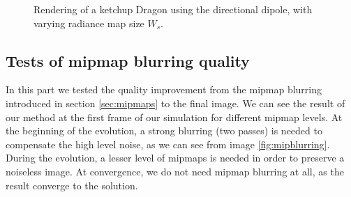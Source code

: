 \begin{figure}
{	\label{fig:pathDragonsize1024}
}
\label{fig:pathDragonsize}
\caption{Rendering of a ketchup Dragon using the directional dipole, with varying radiance map size $W_s$.}
\end{figure}

\FloatBarrier
\subsection{Tests of mipmap blurring quality}

In this part we tested the quality improvement from the mipmap blurring introduced in section \ref{sec:mipmaps} to the final image. We can see the result of our method at the first frame of our simulation for different mipmap levels. At the beginning of the evolution, a strong blurring (two passes) is needed to compensate the high level noise, as we can see from image \ref{fig:mipblurring}. During the evolution, a lesser level of mipmaps is needed in order to preserve a noiseless image. At convergence, we do not need mipmap blurring at all, as the result converge to the solution. 
